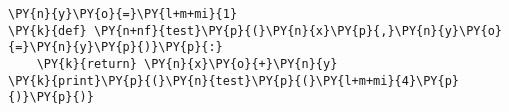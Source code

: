 \begin{Verbatim}[commandchars=\\\{\}]
\PY{n}{y}\PY{o}{=}\PY{l+m+mi}{1}
\PY{k}{def} \PY{n+nf}{test}\PY{p}{(}\PY{n}{x}\PY{p}{,}\PY{n}{y}\PY{o}{=}\PY{n}{y}\PY{p}{)}\PY{p}{:}
    \PY{k}{return} \PY{n}{x}\PY{o}{+}\PY{n}{y}
\PY{k}{print}\PY{p}{(}\PY{n}{test}\PY{p}{(}\PY{l+m+mi}{4}\PY{p}{)}\PY{p}{)}
\end{Verbatim}
